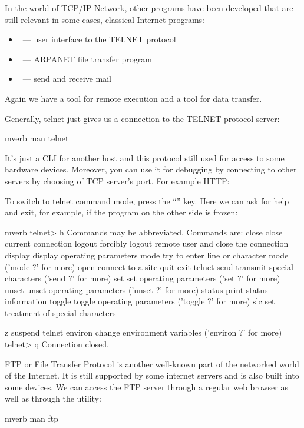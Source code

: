 In the world of TCP/IP Network, other programs have been developed that are
still relevant in some cases, classical Internet programs:
\begin{itemize}
\item {}~--- user interface to the TELNET protocol
\item {}~--- ARPANET file transfer program
\item {}~--- send and receive mail
\end{itemize}
Again we have a tool for remote execution and a tool for data transfer.

Generally, telnet just gives us a connection to the TELNET protocol server:
\begin{code}{mverb}
man telnet
\end{code}
It's just a CLI for another host and this protocol still used for access
to some hardware devices. Moreover, you can use it for debugging by connecting
to other servers by choosing of TCP server's port. For example HTTP:
\begin{code}{mverb}
$ telnet google.com 80
Trying 173.194.73.101...
Connected to google.com.
Escape character is '^]'.
GET /index.html HTTP/1.1
\end{code} %
To switch to telnet command mode, press the ``\struct{Ctrl-]}'' key.
Here we can ask for help and exit, for example, if the program on the other
side is frozen:
\begin{code}{mverb}
telnet> h
Commands may be abbreviated.  Commands are:
close			close current connection
logout		forcibly logout remote user and close the connection
display	display operating parameters
mode				try to enter line or character mode ('mode ?' for more)
open				connect to a site
quit				exit telnet
send				transmit special characters ('send ?' for more)
set					set operating parameters ('set ?' for more)
unset			unset operating parameters ('unset ?' for more)
status		print status information
toggle		toggle operating parameters ('toggle ?' for more)
slc					set treatment of special characters

z							suspend telnet
environ	change environment variables ('environ ?' for more)
telnet> q
Connection closed.
\end{code}

FTP or File Transfer Protocol is another well-known part of the networked
world of the Internet. It is still supported by some internet servers and
is also built into some devices. We can access the FTP server through a regular
web browser as well as through the  utility:
\begin{code}{mverb}
man ftp
\end{code}

